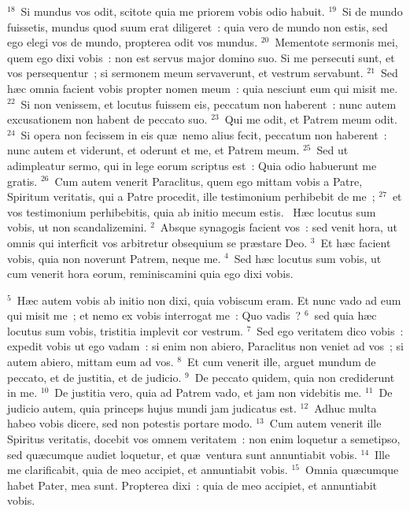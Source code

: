 ${}^{18}$~Si mundus vos odit, scitote quia me priorem vobis odio habuit.
${}^{19}$~Si de mundo fuissetis, mundus quod suum erat diligeret~: quia vero de mundo non estis, sed ego elegi vos de mundo, propterea odit vos mundus.
${}^{20}$~Mementote sermonis mei, quem ego dixi vobis~: non est servus major domino suo. Si me persecuti sunt, et vos persequentur~; si sermonem meum servaverunt, et vestrum servabunt.
${}^{21}$~Sed h\ae c omnia facient vobis propter nomen meum~: quia nesciunt eum qui misit me.
${}^{22}$~Si non venissem, et locutus fuissem eis, peccatum non haberent~: nunc autem excusationem non habent de peccato suo.
${}^{23}$~Qui me odit, et Patrem meum odit.
${}^{24}$~Si opera non fecissem in eis qu\ae\ nemo alius fecit, peccatum non haberent~: nunc autem et viderunt, et oderunt et me, et Patrem meum.
${}^{25}$~Sed ut adimpleatur sermo, qui in lege eorum scriptus est~: Quia odio habuerunt me gratis.
${}^{26}$~Cum autem venerit Paraclitus, quem ego mittam vobis a Patre, Spiritum veritatis, qui a Patre procedit, ille testimonium perhibebit de me~;
${}^{27}$~et vos testimonium perhibebitis, quia ab initio mecum estis.
~H\ae c locutus sum vobis, ut non scandalizemini.
${}^{2}$~Absque synagogis facient vos~: sed venit hora, ut omnis qui interficit vos arbitretur obsequium se pr\ae stare Deo.
${}^{3}$~Et h\ae c facient vobis, quia non noverunt Patrem, neque me.
${}^{4}$~Sed h\ae c locutus sum vobis, ut cum venerit hora eorum, reminiscamini quia ego dixi vobis.


${}^{5}$~H\ae c autem vobis ab initio non dixi, quia vobiscum eram. Et nunc vado ad eum qui misit me~; et nemo ex vobis interrogat me~: Quo vadis~?
${}^{6}$~sed quia h\ae c locutus sum vobis, tristitia implevit cor vestrum.
${}^{7}$~Sed ego veritatem dico vobis~: expedit vobis ut ego vadam~: si enim non abiero, Paraclitus non veniet ad vos~; si autem abiero, mittam eum ad vos.
${}^{8}$~Et cum venerit ille, arguet mundum de peccato, et de justitia, et de judicio.
${}^{9}$~De peccato quidem, quia non crediderunt in me.
${}^{10}$~De justitia vero, quia ad Patrem vado, et jam non videbitis me.
${}^{11}$~De judicio autem, quia princeps hujus mundi jam judicatus est.
${}^{12}$~Adhuc multa habeo vobis dicere, sed non potestis portare modo.
${}^{13}$~Cum autem venerit ille Spiritus veritatis, docebit vos omnem veritatem~: non enim loquetur a semetipso, sed qu\ae cumque audiet loquetur, et qu\ae\ ventura sunt annuntiabit vobis.
${}^{14}$~Ille me clarificabit, quia de meo accipiet, et annuntiabit vobis.
${}^{15}$~Omnia qu\ae cumque habet Pater, mea sunt. Propterea dixi~: quia de meo accipiet, et annuntiabit vobis.


